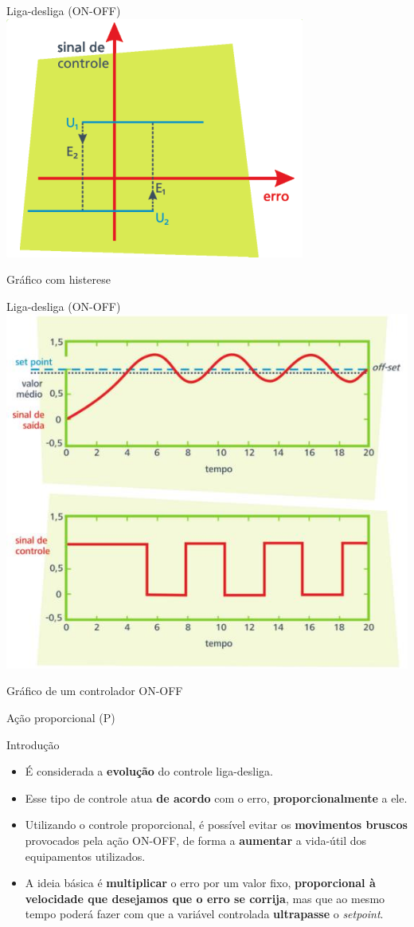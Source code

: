 \begin{frame}{Liga-desliga (ON-OFF)}
	\centering
	\includegraphics[width=0.7\linewidth]{Figuras/Ch12/fig1}
	
	Gráfico com histerese
\end{frame}


\begin{frame}{Liga-desliga (ON-OFF)}
	\centering
	\includegraphics[width=0.65\linewidth]{Figuras/Ch12/fig2}
	
	Gráfico de um controlador ON-OFF
\end{frame}


\begin{frame}{Ação proporcional (P)}
	\begin{block}{Introdução}
		\begin{itemize}
			\item É considerada a \textbf{evolução} do controle liga-desliga.
			\item Esse tipo de controle atua \textbf{de acordo} com o erro, \textbf{proporcionalmente} a ele.
			\item Utilizando o controle proporcional, é possível evitar os \textbf{movimentos bruscos} provocados pela ação ON-OFF, de forma a \textbf{aumentar} a vida-útil dos equipamentos utilizados.
			\item A ideia básica é \textbf{multiplicar} o erro por um valor fixo, \textbf{proporcional à velocidade que desejamos que o erro se corrija}, mas que ao mesmo tempo poderá fazer com que a variável controlada \textbf{ultrapasse} o \textit{setpoint}.
		\end{itemize}
	\end{block}
\end{frame}


